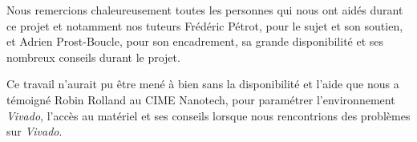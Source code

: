 Nous remercions chaleureusement toutes les personnes qui nous ont aidés durant ce projet
et notamment nos tuteurs
Frédéric Pétrot, pour le sujet
et son soutien,
et Adrien Prost-Boucle,
pour son encadrement, sa grande disponibilité et ses nombreux conseils durant le projet.

Ce travail n’aurait pu être mené à bien sans la disponibilité et l’aide que nous a témoigné
Robin Rolland au CIME Nanotech, pour paramétrer l'environnement {\em Vivado}, l'accès au matériel
et ses conseils lorsque nous rencontrions des problèmes sur {\em Vivado}.
